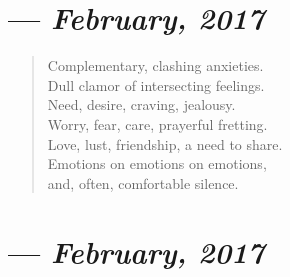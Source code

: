 \section{--- \textit{February, 2017}}

\begin{verse}
Complementary, clashing anxieties.\\
Dull clamor of intersecting feelings.\\
Need, desire, craving, jealousy.\\
Worry, fear, care, prayerful fretting.\\
Love, lust, friendship, a need to share.\\
Emotions on emotions on emotions,\\
and, often, comfortable silence.
\end{verse}
\newpage

\section{--- \textit{February, 2017}}

